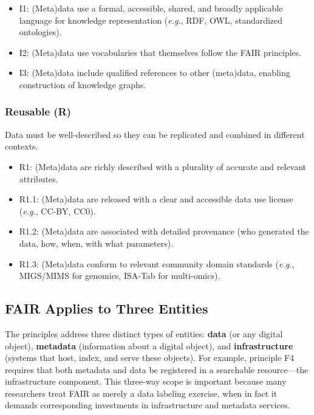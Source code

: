 \begin{itemize}
\item I1: (Meta)data use a formal, accessible, shared, and broadly applicable language for knowledge representation (\textit{e.g.}, RDF, OWL, standardized ontologies).
\item I2: (Meta)data use vocabularies that themselves follow the FAIR principles.
\item I3: (Meta)data include qualified references to other (meta)data, enabling construction of knowledge graphs.
\end{itemize}

\subsubsection{Reusable (R)}

Data must be well-described so they can be replicated and combined in different contexts.

\begin{itemize}
\item R1: (Meta)data are richly described with a plurality of accurate and relevant attributes.
\item R1.1: (Meta)data are released with a clear and accessible data use license (\textit{e.g.}, CC-BY, CC0).
\item R1.2: (Meta)data are associated with detailed provenance (who generated the data, how, when, with what parameters).
\item R1.3: (Meta)data conform to relevant community domain standards (\textit{e.g.}, MIGS/MIMS for genomics, ISA-Tab for multi-omics).
\end{itemize}

\subsection{FAIR Applies to Three Entities}

The principles address three distinct types of entities: \textbf{data} (or any digital object), \textbf{metadata} (information about a digital object), and \textbf{infrastructure} (systems that host, index, and serve these objects). For example, principle F4 requires that both metadata and data be registered in a searchable resource---the infrastructure component. This three-way scope is important because many researchers treat FAIR as merely a data labeling exercise, when in fact it demands corresponding investments in infrastructure and metadata services.

